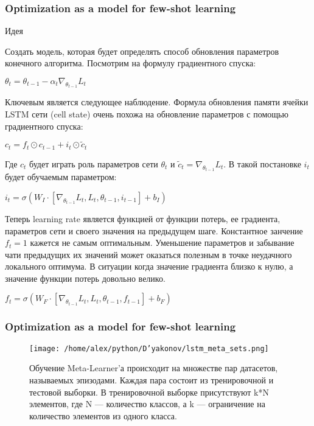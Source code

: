 \documentclass[fleqn, xcolor=x11names]{beamer}
\begin{document}
\begin{frame}\frametitle{Optimization as a model for few-shot learning}

\begin{block}{Идея}
{\footnotesize 
Создать модель, которая будет определять способ обновления параметров конечного алгоритма. Посмотрим на формулу градиентного спуска:
\begin{center}
 $ \theta_t = \theta_{t-1} - \alpha_t \nabla_{\theta_{t-1}}L_t$
\end{center}
Ключевым является следующее наблюдение. Формула обновления памяти ячейки LSTM сети (cell state) очень похожа на обновление параметров с помощью градиентного спуска:
\begin{center}
 $ c_t = f_t \odot c_{t-1} + i_t \odot \tilde{c}_t$
\end{center}
 Где $c_t$ будет играть роль параметров сети $\theta_t$ и $\tilde{c}_t = \nabla_{\theta_{t-1}}L_t$. В такой постановке $i_t$ будет обучаемым параметром:
\begin{center}
 $i_t = \sigma(W_I \cdot \left[ \nabla_{\theta_{t-1}}L_t, L_t, \theta_{t-1}, i_{t-1} \right] + b_I)$
 \end{center}
 Теперь learning rate является функцией от функции потерь, ее градиента, параметров сети и своего значения на предыдущем шаге. Константное занчение $f_t = 1$ кажется не самым оптимальным. Уменьшение параметров и забывание чати предыдущих их значений может оказаться полезным в точке неудачного локального оптимума. В ситуации когда значение градиента близко к нулю, а значение функции потерь довольно велико.
 \begin{center}
 $f_t = \sigma(W_F \cdot \left[ \nabla_{\theta_{t-1}}L_t, L_t, \theta_{t-1}, f_{t-1} \right] + b_F)$
\end{center}
}
\end{block}

\end{frame}



\begin{frame}\frametitle{Optimization as a model for few-shot learning}
\begin{figure}[h]
\begin{center}
\texttt{[image: /home/alex/python/D'yakonov/lstm\_meta\_sets.png]}
\caption{{\footnotesize Обучение Meta-Learner'а происходит на множестве пар датасетов, называемых эпизодами. Каждая пара состоит из тренировочной и тестовой выборки. В тренировочной выборке присутствуют k*N элементов, где N --- количество классов, а k --- ограничение на количество элементов из одного класса. }}
\end{center}
\end{figure}
\end{frame}
\end{document}
